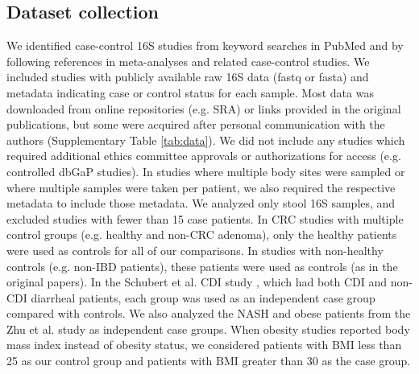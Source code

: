 \documentclass{article}
\begin{document}
\subsection*{Dataset collection}
We identified case-control 16S studies from keyword searches in PubMed and by following references in meta-analyses and related case-control studies.
We included studies with publicly available raw 16S data (fastq or fasta) and metadata indicating case or control status for each sample.
Most data was downloaded from online repositories (e.g. SRA) or links provided in the original publications, but some were acquired after personal communication with the authors (Supplementary Table \ref{tab:data}).
We did not include any studies which required additional ethics committee approvals or authorizations for access (e.g. controlled dbGaP studies).
In studies where multiple body sites were sampled or where multiple samples were taken per patient, we also required the respective metadata to include those metadata.
We analyzed only stool 16S samples, and excluded studies with fewer than 15 case patients.
In CRC studies with multiple control groups (e.g. healthy and non-CRC adenoma), only the healthy patients were used as controls for all of our comparisons.
In studies with non-healthy controls (e.g. non-IBD patients), these patients were used as controls (as in the original papers).
In the Schubert et al. CDI study \cite{cdi-schubert}, which had both CDI and non-CDI diarrheal patients, each group was used as an independent case group compared with controls. 
We also analyzed the NASH and obese patients from the Zhu et al. study \cite{nash-baker} as independent case groups.
When obesity studies reported body mass index instead of obesity status, we considered patients with BMI less than 25 as our control group and patients with BMI greater than 30 as the case group.
\end{document}
